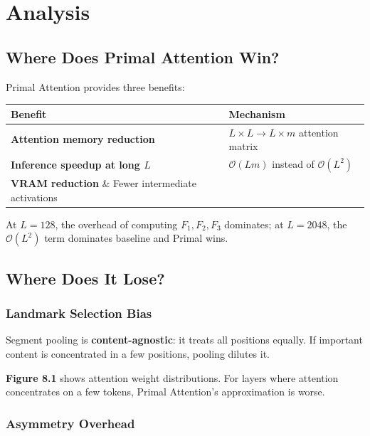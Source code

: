 
\section{Analysis}

\subsection{Where Does Primal Attention Win?}

Primal Attention provides three benefits:

\begin{table}[H]
\centering
\small
\begin{tabular}{ll}
\toprule
\textbf{Benefit} & \textbf{Mechanism} \\
\midrule
\textbf{Attention memory reduction} & $L \times L \to L \times m$ attention matrix \\
\textbf{Inference speedup at long $L$} & $\mathcal{O}(L m)$ instead of $\mathcal{O}(L^2)$ \\
\textbf{VRAM reduction} \& Fewer intermediate activations \\
\bottomrule
\end{tabular}
\end{table}

At $L = 128$, the overhead of computing $F_1, F_2, F_3$ dominates; at 
$L = 2048$, the $\mathcal{O}(L^2)$ term dominates baseline and Primal 
wins.

\subsection{Where Does It Lose?}

\subsubsection{Landmark Selection Bias}

Segment pooling is \textbf{content-agnostic}: it treats all positions equally. 
If important content is concentrated in a few positions, pooling dilutes it.

\textbf{Figure 8.1} shows attention weight distributions. For layers where 
attention concentrates on a few tokens, Primal Attention's approximation 
is worse.

\subsubsection{Asymmetry Overhead}

